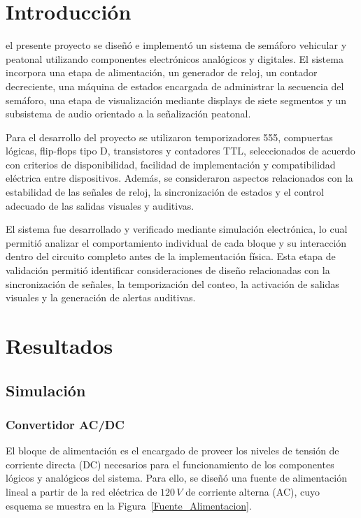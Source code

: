 \documentclass[journal, onecolumn]{IEEEtran}
\begin{document}
\section{Introducción}

 el presente proyecto se diseñó e implementó un sistema de semáforo vehicular y peatonal utilizando componentes electrónicos analógicos y digitales. El sistema incorpora una etapa de alimentación, un generador de reloj, un contador decreciente, una máquina de estados encargada de administrar la secuencia del semáforo, una etapa de visualización mediante displays de siete segmentos y un subsistema de audio orientado a la señalización peatonal.

Para el desarrollo del proyecto se utilizaron temporizadores 555, compuertas lógicas, flip-flops tipo D, transistores y contadores TTL, seleccionados de acuerdo con criterios de disponibilidad, facilidad de implementación y compatibilidad eléctrica entre dispositivos. Además, se consideraron aspectos relacionados con la estabilidad de las señales de reloj, la sincronización de estados y el control adecuado de las salidas visuales y auditivas.

El sistema fue desarrollado y verificado mediante simulación electrónica, lo cual permitió analizar el comportamiento individual de cada bloque y su interacción dentro del circuito completo antes de la implementación física. Esta etapa de validación permitió identificar consideraciones de diseño relacionadas con la sincronización de señales, la temporización del conteo, la activación de salidas visuales y la generación de alertas auditivas.
\section{Resultados}

\subsection{Simulación}

\subsubsection{Convertidor AC/DC}

El bloque de alimentación es el encargado de proveer los niveles de tensión de corriente directa (DC) necesarios para el funcionamiento de los componentes lógicos y analógicos del sistema. Para ello, se diseñó una fuente de alimentación lineal a partir de la red eléctrica de $120\,V$ de corriente alterna (AC), cuyo esquema se muestra en la Figura~\ref{Fuente_Alimentacion}.
\end{document}
